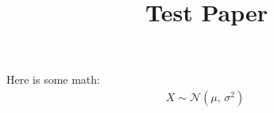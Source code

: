 \documentclass{article}
\title{Test Paper}
\begin{document}
\maketitle

Here is some math:
\begin{align}
X \sim \mathcal{N}(\mu,\,\sigma^{2})\
\end{align}
\end{document}
